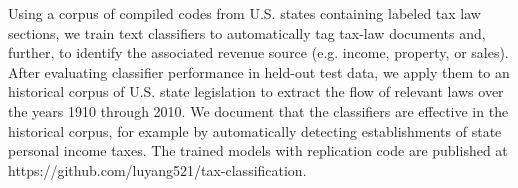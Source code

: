 Using a corpus of compiled codes from U.S. states containing labeled tax law sections, we train text classifiers to automatically tag tax-law documents and, further, to identify the associated revenue source (e.g. income, property, or sales). After evaluating classifier performance in held-out test data, we apply them to an historical corpus of U.S. state legislation to extract the flow of relevant laws over the years 1910 through 2010. We document that the classifiers are effective in the historical corpus, for example by automatically detecting establishments of state personal income taxes. The trained models with replication code are published at https://github.com/luyang521/tax-classification.
